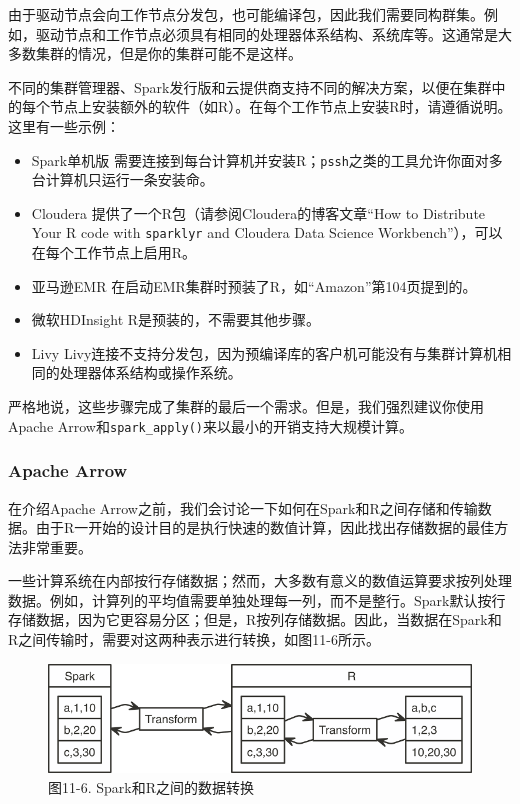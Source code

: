 \documentclass[
]{article}
\providecommand{\tightlist}{%
  \setlength{\itemsep}{0pt}\setlength{\parskip}{0pt}}
\begin{document}
由于驱动节点会向工作节点分发包，也可能编译包，因此我们需要同构群集。例如，驱动节点和工作节点必须具有相同的处理器体系结构、系统库等。这通常是大多数集群的情况，但是你的集群可能不是这样。

不同的集群管理器、Spark发行版和云提供商支持不同的解决方案，以便在集群中的每个节点上安装额外的软件（如R）。在每个工作节点上安装R时，请遵循说明。这里有一些示例：

\begin{itemize}
\tightlist
\item
  Spark单机版
  需要连接到每台计算机并安装R；\texttt{pssh}之类的工具允许你面对多台计算机只运行一条安装命。
\item
  Cloudera 提供了一个R包（请参阅Cloudera的博客文章``How to Distribute
  Your R code with \texttt{sparklyr} and Cloudera Data Science
  Workbench''），可以在每个工作节点上启用R。
\item
  亚马逊EMR 在启动EMR集群时预装了R，如``Amazon''第104页提到的。
\item
  微软HDInsight R是预装的，不需要其他步骤。
\item
  Livy
  Livy连接不支持分发包，因为预编译库的客户机可能没有与集群计算机相同的处理器体系结构或操作系统。
\end{itemize}

严格地说，这些步骤完成了集群的最后一个需求。但是，我们强烈建议你使用Apache
Arrow和\texttt{spark\_apply()}来以最小的开销支持大规模计算。

\hypertarget{apache-arrow}{%
\subsubsection{Apache Arrow}\label{apache-arrow}}

在介绍Apache
Arrow之前，我们会讨论一下如何在Spark和R之间存储和传输数据。由于R一开始的设计目的是执行快速的数值计算，因此找出存储数据的最佳方法非常重要。

一些计算系统在内部按行存储数据；然而，大多数有意义的数值运算要求按列处理数据。例如，计算列的平均值需要单独处理每一列，而不是整行。Spark默认按行存储数据，因为它更容易分区；但是，R按列存储数据。因此，当数据在Spark和R之间传输时，需要对这两种表示进行转换，如图11-6所示。

\begin{figure}
\centering
\includegraphics{figures/11_6.png}
\caption{图11-6. Spark和R之间的数据转换}
\end{figure}
\end{document}
